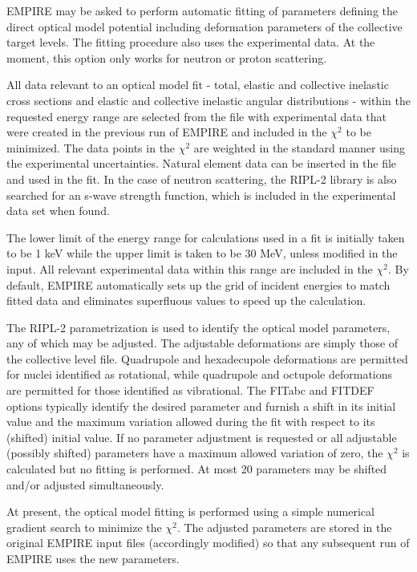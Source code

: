 EMPIRE may be asked to perform automatic fitting of parameters defining the
direct optical model potential including deformation parameters of the
collective target levels. The fitting procedure also uses the experimental
data. At the moment, this option only works for neutron or proton scattering.

All data relevant to an optical model fit - total, elastic and collective
inelastic cross sections and elastic and collective inelastic angular
distributions - within the requested energy range are selected from the file
with experimental data that were created in the previous run of EMPIRE and
included in the $\chi^{2}$ to be minimized. The data points in the $\chi^{2}$
are weighted in the standard manner using the experimental uncertainties.
Natural element data can be inserted in the file and used in the fit. In the
case of neutron scattering, the RIPL-2 library is also searched for an
s-wave strength function, which is included in the experimental data set
when found.

The lower limit of the energy range for calculations used in a fit is
initially taken to be 1 keV while the upper limit is taken to be 30 MeV,
unless modified in the input. All relevant experimental data within this
range are included in the $\chi^{2}$. By default, EMPIRE automatically sets
up the grid of incident energies to match fitted data and eliminates
superfluous values to speed up the calculation.

The RIPL-2 parametrization is used to identify the optical model parameters,
any of which may be adjusted. The adjustable deformations are simply those
of the collective level file. Quadrupole and hexadecupole deformations are
permitted for nuclei identified as rotational, while quadrupole and octupole
deformations are permitted for those identified as vibrational. The FITabc
and FITDEF options typically identify the desired parameter and furnish a
shift in its initial value and the maximum variation allowed during the fit
with respect to its (shifted) initial value. If no parameter adjustment is
requested or all adjustable (possibly shifted) parameters have a maximum
allowed variation of zero, the $\chi^{2}$ is calculated but no fitting is
performed. At most 20 parameters may be shifted and/or adjusted
simultaneously.

At present, the optical model fitting is performed using a simple numerical
gradient search to minimize the $\chi^{2}$. The adjusted parameters are
stored in the original EMPIRE input files (accordingly modified) so that any
subsequent run of EMPIRE uses the new parameters.

